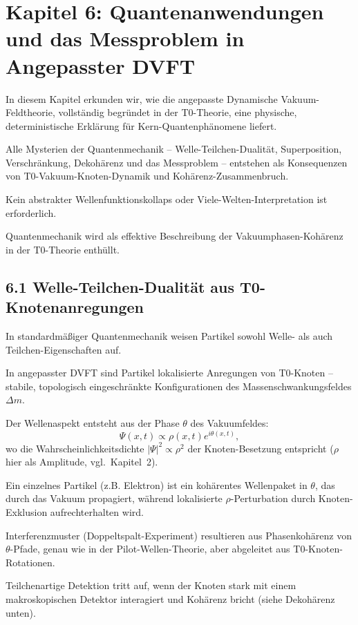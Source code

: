 	\section{Kapitel 6: Quantenanwendungen und das Messproblem in Angepasster DVFT}
	
	In diesem Kapitel erkunden wir, wie die angepasste Dynamische Vakuum-Feldtheorie, vollständig begründet in der T0-Theorie, eine physische, deterministische Erklärung für Kern-Quantenphänomene liefert.
	
	Alle Mysterien der Quantenmechanik – Welle-Teilchen-Dualität, Superposition, Verschränkung, Dekohärenz und das Messproblem – entstehen als Konsequenzen von T0-Vakuum-Knoten-Dynamik und Kohärenz-Zusammenbruch.
	
	Kein abstrakter Wellenfunktionskollaps oder Viele-Welten-Interpretation ist erforderlich.
	
	Quantenmechanik wird als effektive Beschreibung der Vakuumphasen-Kohärenz in der T0-Theorie enthüllt.
	
	\subsection{6.1 Welle-Teilchen-Dualität aus T0-Knotenanregungen}
	
	In standardmäßiger Quantenmechanik weisen Partikel sowohl Welle- als auch Teilchen-Eigenschaften auf.
	
	In angepasster DVFT sind Partikel lokalisierte Anregungen von T0-Knoten – stabile, topologisch eingeschränkte Konfigurationen des Massenschwankungsfeldes $\Delta m$.
	
	Der Wellenaspekt entsteht aus der Phase $\theta$ des Vakuumfeldes:
	\[
	\Psi(x,t) \propto \rho(x,t) e^{i\theta(x,t)},
	\]
	wo die Wahrscheinlichkeitsdichte $|\Psi|^2 \propto \rho^2$ der Knoten-Besetzung entspricht ($\rho$ hier als Amplitude, vgl.\ Kapitel~2).
	
	Ein einzelnes Partikel (z.B. Elektron) ist ein kohärentes Wellenpaket in $\theta$, das durch das Vakuum propagiert, während lokalisierte $\rho$-Perturbation durch Knoten-Exklusion aufrechterhalten wird.
	
	Interferenzmuster (Doppeltspalt-Experiment) resultieren aus Phasenkohärenz von $\theta$-Pfade, genau wie in der Pilot-Wellen-Theorie, aber abgeleitet aus T0-Knoten-Rotationen.
	
	Teilchenartige Detektion tritt auf, wenn der Knoten stark mit einem makroskopischen Detektor interagiert und Kohärenz bricht (siehe Dekohärenz unten).
	
